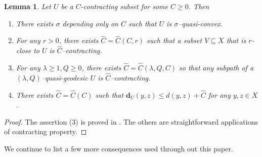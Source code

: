 \documentclass{amsart}
\newtheorem{cor}[thm]{Corollary}
\newtheorem{lem}[thm]{Lemma}
\theoremstyle{definition}
\theoremstyle{remark}
\newcommand{\U}{ X}
\newcommand{\proj}{\textbf{d}}
\begin{document}
\begin{lem}\label{BigThree}
Let $U$ be a $C$-contracting subset for some $C\ge 0$. Then 
\begin{enumerate}
\item
There exists $\sigma$ depending only on $C$ such that   $U$ is $\sigma$--quasi-convex.
\item
For any $r>0$, there exists $\hat C=\hat C(C, r)$ such that a subset $V\subseteq \U$ that is $r$-close to $U$ is $\hat C$--contracting. 
\item
For any $\lambda\ge 1, Q\ge 0$, there exists $\hat C=\hat C(\lambda, Q, C)$ so that any subpath of a  $(\lambda, Q)$--quasi-geodesic $U$ is $\hat C$--contracting. 
\item 
There exists $\hat C=\hat C(C)$ such that   $\proj_U(y, z)\le d(y, z)+\hat C$ for any $y,z\in \U$.
\end{enumerate}
\end{lem}
\begin{proof}
The assertion (3) is proved in \cite[Prop 2.2.3]{YANG11}. The others are straightforward applications of contracting property.   
\end{proof}

 




\iffalse
We continue to list a few more consequences used through out this paper.
\end{document}
